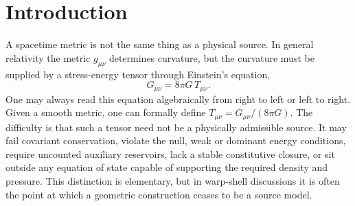 \documentclass[11pt,a4paper]{article}
\begin{document}
\begin{abstract}
At fixed compactness $u=0.20$ and under an explicit illustrative scale mapping $I_{S}R^{2}=10^{6}\,\mathrm{km}^{2}$ (a stated normalisation, not a relation derived from the audit), the clean reduced index maps to $R\simeq217.3\,\mathrm{km}$, $M\simeq29.4\,M_{\odot}$ and reconstructed peak density $\rho_{\mathrm{peak}}\simeq3.5\times10^{15}\,\mathrm{kg\,m^{-3}}$; these values are conditional on the $6.39$ anchor and the scale constant. The ordinary isotropic equation-of-state/Tolman--Oppenheimer--Volkoff (TOV) comparison, materials, operations and standards gates all fail. The result is a reproducible stress-energy-first finite-audit framework together with a matter-realisation obstruction on the audited class --- not a warp-drive construction, a universal no-go theorem, or a fully GR-derived response bound.
\end{abstract}

\section{Introduction}\label{sec:intro}

A spacetime metric is not the same thing as a physical source. In general relativity the metric $g_{\mu\nu}$ determines curvature, but the curvature must be supplied by a stress-energy tensor through Einstein's equation,
\[
G_{\mu\nu}=8\pi G\,T_{\mu\nu}.
\]
One may always read this equation algebraically from right to left or left to right. Given a smooth metric, one can formally define $T_{\mu\nu}=G_{\mu\nu}/(8\pi G)$. The difficulty is that such a tensor need not be a physically admissible source. It may fail covariant conservation, violate the null, weak or dominant energy conditions, require uncounted auxiliary reservoirs, lack a stable constitutive closure, or sit outside any equation of state capable of supporting the required density and pressure. This distinction is elementary, but in warp-shell discussions it is often the point at which a geometric construction ceases to be a source model. \cite{Wald1984,HawkingEllis1973}
\end{document}
